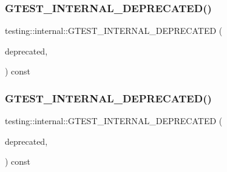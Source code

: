 \subsubsection{\texorpdfstring{GTEST\_INTERNAL\_DEPRECATED()}{GTEST\_INTERNAL\_DEPRECATED()}\hspace{0.1cm}{\footnotesize\ttfamily [3/5]}}
{\footnotesize\ttfamily testing\+::internal\+::\+G\+T\+E\+S\+T\+\_\+\+I\+N\+T\+E\+R\+N\+A\+L\+\_\+\+D\+E\+P\+R\+E\+C\+A\+T\+ED (\begin{DoxyParamCaption}\item[{\char`\"{}T\+Y\+P\+E\+D\+\_\+\+T\+E\+S\+T\+\_\+\+C\+A\+SE is}]{deprecated,  }\item[{please use \char`\"{} \char`\"{}\mbox{\hyperlink{namespacetesting_a47a357ed1077c1b52ba654b7753714bc}{T\+Y\+P\+E\+D\+\_\+\+T\+E\+S\+T\+\_\+\+S\+U\+I\+TE}}\char`\"{}}]{ }\end{DoxyParamCaption}) const}

\mbox{\label{namespacetesting_1_1internal_ad10c37bd148fb8988a1d99e127891203}} 
\subsubsection{\texorpdfstring{GTEST\_INTERNAL\_DEPRECATED()}{GTEST\_INTERNAL\_DEPRECATED()}\hspace{0.1cm}{\footnotesize\ttfamily [4/5]}}
{\footnotesize\ttfamily testing\+::internal\+::\+G\+T\+E\+S\+T\+\_\+\+I\+N\+T\+E\+R\+N\+A\+L\+\_\+\+D\+E\+P\+R\+E\+C\+A\+T\+ED (\begin{DoxyParamCaption}\item[{\char`\"{}R\+E\+G\+I\+S\+T\+E\+R\+\_\+\+T\+Y\+P\+E\+D\+\_\+\+T\+E\+S\+T\+\_\+\+C\+A\+S\+E\+\_\+P is}]{deprecated,  }\item[{please use \char`\"{} \char`\"{}\mbox{\hyperlink{namespacetesting_ac025be5150f4d250cfd8136063e2f2a1}{R\+E\+G\+I\+S\+T\+E\+R\+\_\+\+T\+Y\+P\+E\+D\+\_\+\+T\+E\+S\+T\+\_\+\+S\+U\+I\+T\+E\+\_\+P}}\char`\"{}}]{ }\end{DoxyParamCaption}) const}

\mbox{\label{namespacetesting_1_1internal_ab9dabaaecfb36c469b3382a169a581db}} 
